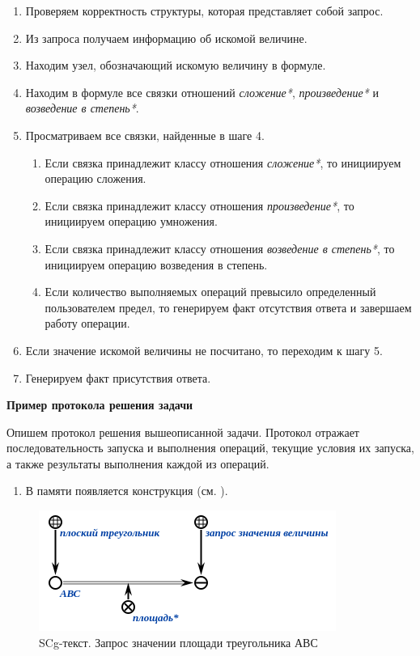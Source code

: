 \begin{enumerate}
	\item
	Проверяем корректность структуры, которая представляет собой запрос.
	\item
	Из запроса получаем информацию об искомой величине.
	\item
	Находим узел, обозначающий искомую величину в формуле.
	\item
	Находим в формуле все связки отношений \textit{сложение*}, \textit{произведение*} и \textit{возведение в степень*}.
	\item
	Просматриваем все связки, найденные в шаге 4.
	
	\begin{enumerate}
		\def\labelenumii{\arabic{enumii}.}
		\item
		Если связка принадлежит классу отношения \textit{сложение*}, то инициируем операцию сложения.
		\item
		Если связка принадлежит классу отношения \textit{произведение*}, то инициируем операцию умножения.
		\item
		Если связка принадлежит классу отношения \textit{возведение в степень*}, то инициируем операцию возведения в степень.
		\item
		Если количество выполняемых операций превысило определенный пользователем предел, то генерируем факт отсутствия ответа и завершаем работу операции.
	\end{enumerate}
	\item
	Если значение искомой величины не посчитано, то переходим к шагу 5.
	\item
	Генерируем факт присутствия ответа.
\end{enumerate}

\textbf{Пример протокола решения задачи}

Опишем протокол решения вышеописанной задачи. Протокол отражает последовательность запуска и выполнения операций, текущие условия их запуска, а также результаты выполнения каждой из операций.

\begin{enumerate}
	\item
	В памяти появляется конструкция (см. ).
\end{enumerate}

\begin{figure}[H]
	\includegraphics[scale=0.85]{images/part7/chapter_learning_systems/step1-kbe.png}
	\caption{SCg-текст. Запрос значении площади треугольника АВС}
	\label{fig:step1}
\end{figure}

